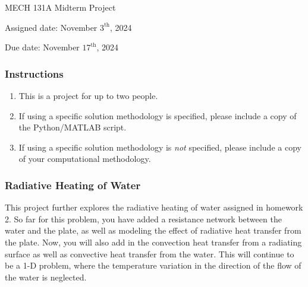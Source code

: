 \documentclass[12pt,letterpaper]{article}
\begin{document}
\noindent
MECH 131A Midterm Project

\noindent
Assigned date: November $3^{\mathrm{th}}$, 2024

\noindent
Due date: November $17^{\mathrm{th}}$, 2024

\subsubsection*{Instructions}
\begin{enumerate}
	\item This is a project for up to two people.
	\item If using a specific solution methodology is specified, please include a copy of the Python/MATLAB script.
	\item If using a specific solution methodology is \textit{not} specified, please include a copy of your computational methodology.
\end{enumerate}

\subsubsection*{Radiative Heating of Water}

This project further explores the radiative heating of water assigned in homework 2.
So far for this problem, you have added a resistance network between the water and the plate, as well as modeling the effect of radiative heat transfer from the plate.
Now, you will also add in the convection heat transfer from a radiating surface as well as convective heat transfer from the water.
This will continue to be a 1-D problem, where the temperature variation in the direction of the flow of the water is neglected.
\end{document}
